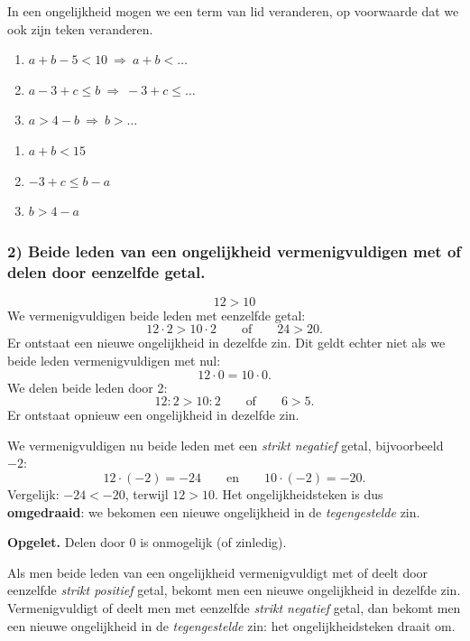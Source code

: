 \documentclass{bis}
\begin{document}
\begin{onthoud}
In een ongelijkheid mogen we een term van lid veranderen, op voorwaarde dat we ook zijn teken
veranderen.
\end{onthoud}

\begin{exercise}
\begin{enumerate}
  \item $a+b-5<10\ \Rightarrow\ a+b<\ldots$
  \item $a-3+c\leq b\ \Rightarrow\ -3+c\leq\ldots$
  \item $a>4-b\ \Rightarrow\ b>\ldots$
\end{enumerate}
\end{exercise}

\begin{solution}
\begin{enumerate}
  \item $a+b<15$
  \item $-3+c\leq b-a$
  \item $b>4-a$
\end{enumerate}
\end{solution}

\subsubsection*{2) Beide leden van een ongelijkheid vermenigvuldigen met of delen door eenzelfde getal.}
\[12>10\]
We vermenigvuldigen beide leden met eenzelfde getal:
\[12\cdot2>10\cdot2\qquad\text{of}\qquad24>20.\]
Er ontstaat een nieuwe ongelijkheid in dezelfde zin. Dit geldt echter niet als we beide leden
vermenigvuldigen met nul:
\[12\cdot0=10\cdot0.\]
We delen beide leden door 2:
\[12:2>10:2\qquad\text{of}\qquad6>5.\]
Er ontstaat opnieuw een ongelijkheid in dezelfde zin.

We vermenigvuldigen nu beide leden met een \emph{strikt negatief} getal, bijvoorbeeld $-2$:
\[12\cdot(-2)=-24\qquad\text{en}\qquad10\cdot(-2)=-20.\]
Vergelijk: $-24<-20$, terwijl $12>10$. Het ongelijkheidsteken is dus \textbf{omgedraaid}: we
bekomen een nieuwe ongelijkheid in de \emph{tegengestelde} zin.

\textbf{Opgelet.} Delen door 0 is onmogelijk (of zinledig).
\begin{onthoud}
Als men beide leden van een ongelijkheid vermenigvuldigt met of deelt door eenzelfde
\emph{strikt positief} getal, bekomt men een nieuwe ongelijkheid in dezelfde zin. Vermenigvuldigt
of deelt men met eenzelfde \emph{strikt negatief} getal, dan bekomt men een nieuwe ongelijkheid
in de \emph{tegengestelde} zin: het ongelijkheidsteken draait om.
\end{onthoud}
\end{document}
